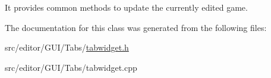 \-It provides common methods to update the currently edited game. 

\-The documentation for this class was generated from the following files\-:\begin{DoxyCompactItemize}
\item 
src/editor/\-G\-U\-I/\-Tabs/\hyperlink{tabwidget_8h}{tabwidget.\-h}\item 
src/editor/\-G\-U\-I/\-Tabs/tabwidget.\-cpp\end{DoxyCompactItemize}
